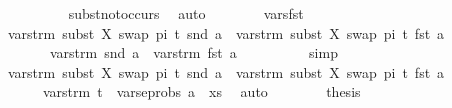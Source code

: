 \begin{isabellebody}
\ \ \ \ \ \ \ \ \isamarkupfalse%
\ subst{\isacharunderscore}{\kern0pt}not{\isacharunderscore}{\kern0pt}occurs\ \isamarkupfalse%
\ auto\isanewline
\ \ \ \ \ \ \isamarkupfalse%
\ vars{\isacharunderscore}{\kern0pt}fst\isanewline
\ \ \ \ \ \ \isamarkupfalse%
\ {\isachardoublequoteopen}vars{\isacharunderscore}{\kern0pt}trm\ {\isacharparenleft}{\kern0pt}subst\ {\isacharbrackleft}{\kern0pt}{\isacharparenleft}{\kern0pt}X{\isacharcomma}{\kern0pt}\ swap\ pi\ t{\isacharparenright}{\kern0pt}{\isacharbrackright}{\kern0pt}\ {\isacharparenleft}{\kern0pt}snd\ a{\isacharparenright}{\kern0pt}{\isacharparenright}{\kern0pt}\ {\isasymunion}\ vars{\isacharunderscore}{\kern0pt}trm\ {\isacharparenleft}{\kern0pt}subst\ {\isacharbrackleft}{\kern0pt}{\isacharparenleft}{\kern0pt}X{\isacharcomma}{\kern0pt}\ swap\ pi\ t{\isacharparenright}{\kern0pt}{\isacharbrackright}{\kern0pt}\ {\isacharparenleft}{\kern0pt}fst\ a{\isacharparenright}{\kern0pt}{\isacharparenright}{\kern0pt}\ \ {\isacharequal}{\kern0pt}\ \isanewline
\ \ \ \ \ \ \ vars{\isacharunderscore}{\kern0pt}trm\ {\isacharparenleft}{\kern0pt}snd\ a{\isacharparenright}{\kern0pt}\ {\isasymunion}\ vars{\isacharunderscore}{\kern0pt}trm\ {\isacharparenleft}{\kern0pt}fst\ a{\isacharparenright}{\kern0pt}{\isachardoublequoteclose}\isanewline
\ \ \ \ \ \ \ \ \isamarkupfalse%
\ simp\isanewline
\ \ \ \ \ \ \isamarkupfalse%
\ {\isachardoublequoteopen}vars{\isacharunderscore}{\kern0pt}trm\ {\isacharparenleft}{\kern0pt}subst\ {\isacharbrackleft}{\kern0pt}{\isacharparenleft}{\kern0pt}X{\isacharcomma}{\kern0pt}\ swap\ pi\ t{\isacharparenright}{\kern0pt}{\isacharbrackright}{\kern0pt}\ {\isacharparenleft}{\kern0pt}snd\ a{\isacharparenright}{\kern0pt}{\isacharparenright}{\kern0pt}\ {\isasymunion}\ vars{\isacharunderscore}{\kern0pt}trm\ {\isacharparenleft}{\kern0pt}subst\ {\isacharbrackleft}{\kern0pt}{\isacharparenleft}{\kern0pt}X{\isacharcomma}{\kern0pt}\ swap\ pi\ t{\isacharparenright}{\kern0pt}{\isacharbrackright}{\kern0pt}\ {\isacharparenleft}{\kern0pt}fst\ a{\isacharparenright}{\kern0pt}{\isacharparenright}{\kern0pt}\ {\isasymsubseteq}\ \isanewline
\ \ \ \ \ \ vars{\isacharunderscore}{\kern0pt}trm\ t\ {\isasymunion}\ vars{\isacharunderscore}{\kern0pt}eprobs\ {\isacharparenleft}{\kern0pt}a\ {\isacharhash}{\kern0pt}\ xs{\isacharparenright}{\kern0pt}{\isachardoublequoteclose}\ \isamarkupfalse%
\ auto\isanewline
\ \ \ \ \ \ \isamarkupfalse%
\ {\isacharquery}{\kern0pt}thesis\ \isamarkupfalse%

\end{isabellebody}
